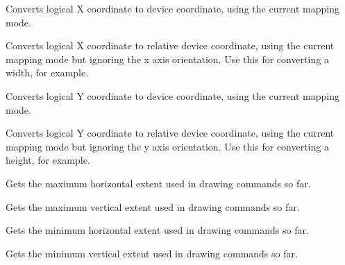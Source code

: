
Converts logical X coordinate to device coordinate, using the current
mapping mode.


\label{wxdclogicaltodevicexrel}


Converts logical X coordinate to relative device coordinate, using the current
mapping mode but ignoring the x axis orientation.
Use this for converting a width, for example.


\label{wxdclogicaltodevicey}


Converts logical Y coordinate to device coordinate, using the current
mapping mode.


\label{wxdclogicaltodeviceyrel}


Converts logical Y coordinate to relative device coordinate, using the current
mapping mode but ignoring the y axis orientation.
Use this for converting a height, for example.


\label{wxdcmaxx}


Gets the maximum horizontal extent used in drawing commands so far.


\label{wxdcmaxy}


Gets the maximum vertical extent used in drawing commands so far.


\label{wxdcminx}


Gets the minimum horizontal extent used in drawing commands so far.


\label{wxdcminy}


Gets the minimum vertical extent used in drawing commands so far.


\label{wxdcisok}


